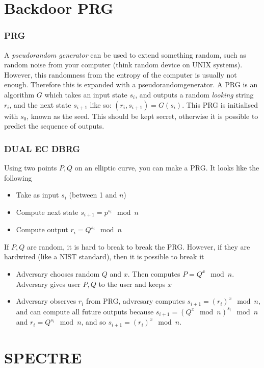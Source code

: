 \section{Backdoor PRG}
\begin{frame}
    \frametitle{PRG}
        A \textit{pseudorandom generator} can be used to extend something random, such as random noise from your computer (think random device on UNIX systems). However, this randomness from the entropy of the computer is usually not enough. Therefore this is expanded with a pseudorandomgenerator. A PRG is an algorithm $G$ which takes an input state $s_i$, and outputs a random \textit{looking} string $r_i$, and the next state $s_{i + 1}$ like so: $(r_i, s_{i +1}) = G(s_i)$. This PRG is initialised with $s_0$, known as the seed. This should be kept secret, otherwise it is possible to predict the sequence of outputs. 
\end{frame}
    \begin{frame}
        \frametitle{DUAL EC DBRG}
            Using two points $P, Q$ on an elliptic curve, you can make a PRG. It looks like the following
            \begin{itemize}
                \item Take as input $s_i$ (between 1 and $n$)
                \item Compute next state $s_{i + 1} = p^{s_i} \mod n$
                \item Compute output $r_i = Q^{s_i} \mod n$
            \end{itemize}
            If $P, Q$ are random, it is hard to break to break the PRG. However, if they are hardwired (like a NIST standard), then it is possible to break it
            \begin{itemize}
                \item Adversary chooses random $Q$ and $x$. Then computes $P = Q^x \mod n$. Adversary gives user $P, Q$ to the user and keeps $x$
                \item Adversary observes $r_i$ from PRG, advresary computes $s_{i + 1} = (r_i)^x \mod n$, and can compute all future outputs because $s_{i + 1} = (Q^x \mod n)^{s_i} \mod n$ and $r_i = Q^{s_i} \mod n$, and so $s_{i + 1} = (r_i)^x \mod n$.  
            \end{itemize}
    \end{frame}


\section{SPECTRE}

